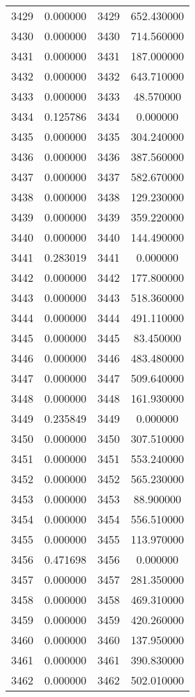 \documentclass[12pt]{article}
\begin{document}
\begin{longtable}{@{}cccc@{}}
3429 & 0.000000 & 3429 & 652.430000 \\
3430 & 0.000000 & 3430 & 714.560000 \\
3431 & 0.000000 & 3431 & 187.000000 \\
3432 & 0.000000 & 3432 & 643.710000 \\
3433 & 0.000000 & 3433 & 48.570000 \\
3434 & 0.125786 & 3434 & 0.000000 \\
3435 & 0.000000 & 3435 & 304.240000 \\
3436 & 0.000000 & 3436 & 387.560000 \\
3437 & 0.000000 & 3437 & 582.670000 \\
3438 & 0.000000 & 3438 & 129.230000 \\
3439 & 0.000000 & 3439 & 359.220000 \\
3440 & 0.000000 & 3440 & 144.490000 \\
3441 & 0.283019 & 3441 & 0.000000 \\
3442 & 0.000000 & 3442 & 177.800000 \\
3443 & 0.000000 & 3443 & 518.360000 \\
3444 & 0.000000 & 3444 & 491.110000 \\
3445 & 0.000000 & 3445 & 83.450000 \\
3446 & 0.000000 & 3446 & 483.480000 \\
3447 & 0.000000 & 3447 & 509.640000 \\
3448 & 0.000000 & 3448 & 161.930000 \\
3449 & 0.235849 & 3449 & 0.000000 \\
3450 & 0.000000 & 3450 & 307.510000 \\
3451 & 0.000000 & 3451 & 553.240000 \\
3452 & 0.000000 & 3452 & 565.230000 \\
3453 & 0.000000 & 3453 & 88.900000 \\
3454 & 0.000000 & 3454 & 556.510000 \\
3455 & 0.000000 & 3455 & 113.970000 \\
3456 & 0.471698 & 3456 & 0.000000 \\
3457 & 0.000000 & 3457 & 281.350000 \\
3458 & 0.000000 & 3458 & 469.310000 \\
3459 & 0.000000 & 3459 & 420.260000 \\
3460 & 0.000000 & 3460 & 137.950000 \\
3461 & 0.000000 & 3461 & 390.830000 \\
3462 & 0.000000 & 3462 & 502.010000 \\

\end{longtable}
\end{document}
